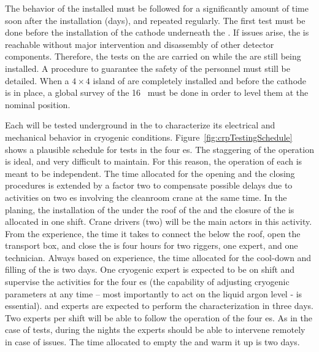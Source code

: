 The  behavior of the installed  must be followed for a significantly amount of time soon after the installation (days), and repeated regularly.
The first test must be done before the installation of the cathode underneath the . If issues arise, the  is reachable without major intervention and disassembly of other detector components.
Therefore, the  tests on the  are carried on while the  are still being installed.
A procedure to guarantee the safety of the personnel must still be detailed.
When a $4 \times 4$ island of  are completely installed and before the cathode is in place, a global survey of the 16~ must be done in order to level them at the nominal position.



Each  will be tested underground in the  \coldbox to characterize its electrical and mechanical behavior in cryogenic conditions.
Figure~\ref{fig:crpTestingSchedule} shows a plausible schedule for tests in the four  \coldbox{}es.
The staggering of the  \coldbox operation is ideal, and very difficult to maintain.
For this reason, the operation of each  \coldbox is meant to be independent.
The time allocated for the opening and the closing procedures is extended by a factor two to compensate possible delays due to activities on two  \coldbox{}es involving the cleanroom crane at the same time.
In the planing, the installation of the  under the roof of the  \coldbox and the closure of the  \coldbox is allocated in one shift.
Crane drivers (two) will be the main actors in this activity.
From the  experience, the time it takes to connect the  below the  \coldbox roof, open the transport box, and close the  \coldbox is four hours for two riggers, one  expert, and one technician.
Always based on  experience, the time allocated for the cool-down and filling of the  \coldbox is two days.
One cryogenic expert is expected to be on shift and supervise the activities for the four  \coldbox{}es (the capability of adjusting cryogenic parameters at any time -- most importantly to act on the liquid argon level - is essential).
 and  experts are expected to perform the characterization in three days.
Two experts per shift will be able to follow the operation of the four  \coldbox{}es.
As in the case of   \coldbox tests, during the nights the experts should be able to intervene remotely in case of issues.
The time allocated to empty the  \coldbox and warm it up is two days.
